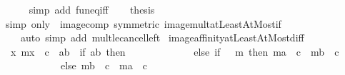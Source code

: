 \begin{isabellebody}
\ \ \ \ \isamarkupfalse%
\ {\isacharparenleft}{\kern0pt}simp\ add{\isacharcolon}{\kern0pt}\ fun{\isacharunderscore}{\kern0pt}eq{\isacharunderscore}{\kern0pt}iff{\isacharparenright}{\kern0pt}\isanewline
\ \ \isamarkupfalse%
\ {\isacharquery}{\kern0pt}thesis\ \isamarkupfalse%
\ {\isacharparenleft}{\kern0pt}simp\ only{\isacharcolon}{\kern0pt}\ {\isacharasterisk}{\kern0pt}\ image{\isacharunderscore}{\kern0pt}comp\ {\isacharbrackleft}{\kern0pt}symmetric{\isacharbrackright}{\kern0pt}\ image{\isacharunderscore}{\kern0pt}mult{\isacharunderscore}{\kern0pt}atLeastAtMost{\isacharunderscore}{\kern0pt}if{\isacharparenright}{\kern0pt}\isanewline
\ \ \ \ {\isacharparenleft}{\kern0pt}auto\ simp\ add{\isacharcolon}{\kern0pt}\ mult{\isacharunderscore}{\kern0pt}le{\isacharunderscore}{\kern0pt}cancel{\isacharunderscore}{\kern0pt}left{\isacharparenright}{\kern0pt}\isanewline
{}\isamarkupfalse%
%
\endisatagproof
{\isafoldproof}%
%
\isadelimproof
\isanewline
%
\endisadelimproof
\isanewline
{}\isamarkupfalse%
\ image{\isacharunderscore}{\kern0pt}affinity{\isacharunderscore}{\kern0pt}atLeastAtMost{\isacharunderscore}{\kern0pt}diff{\isacharcolon}{\kern0pt}\isanewline
\ \ {\isachardoublequoteopen}{\isacharparenleft}{\kern0pt}{\isacharparenleft}{\kern0pt}{\isasymlambda}x{\isachardot}{\kern0pt}\ m{\isacharasterisk}{\kern0pt}x\ {\isacharminus}{\kern0pt}\ c{\isacharparenright}{\kern0pt}\ {\isacharbackquote}{\kern0pt}\ {\isacharbraceleft}{\kern0pt}a{\isachardot}{\kern0pt}{\isachardot}{\kern0pt}b{\isacharbraceright}{\kern0pt}{\isacharparenright}{\kern0pt}\ {\isacharequal}{\kern0pt}\ {\isacharparenleft}{\kern0pt}if\ {\isacharbraceleft}{\kern0pt}a{\isachardot}{\kern0pt}{\isachardot}{\kern0pt}b{\isacharbraceright}{\kern0pt}{\isacharequal}{\kern0pt}{\isacharbraceleft}{\kern0pt}{\isacharbraceright}{\kern0pt}\ then\ {\isacharbraceleft}{\kern0pt}{\isacharbraceright}{\kern0pt}\isanewline
\ \ \ \ \ \ \ \ \ \ \ \ else\ if\ {}\ {\isasymle}\ m\ then\ {\isacharbraceleft}{\kern0pt}m{\isacharasterisk}{\kern0pt}a\ {\isacharminus}{\kern0pt}\ c\ {\isachardot}{\kern0pt}{\isachardot}{\kern0pt}\ m{\isacharasterisk}{\kern0pt}b\ {\isacharminus}{\kern0pt}\ c{\isacharbraceright}{\kern0pt}\isanewline
\ \ \ \ \ \ \ \ \ \ \ \ else\ {\isacharbraceleft}{\kern0pt}m{\isacharasterisk}{\kern0pt}b\ {\isacharminus}{\kern0pt}\ c\ {\isachardot}{\kern0pt}{\isachardot}{\kern0pt}\ m{\isacharasterisk}{\kern0pt}a\ {\isacharminus}{\kern0pt}\ c{\isacharbraceright}{\kern0pt}{\isacharparenright}{\kern0pt}{\isachardoublequoteclose}\isanewline
%
\isadelimproof

\end{isabellebody}
